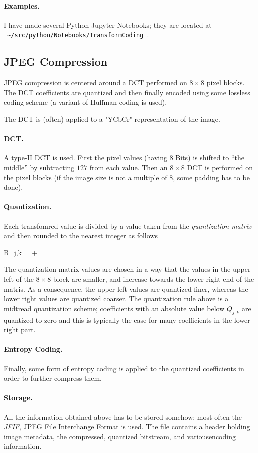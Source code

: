 \paragraph{Examples.} I have made several Python Jupyter Notebooks; they are located at \\ \verb+ ~/src/python/Notebooks/TransformCoding +. 

\subsection{JPEG Compression}

JPEG compression is centered around a DCT performed on $8 \times 8$ pixel blocks. The DCT coefficients are quantized and then finally encoded using some lossless coding scheme (a variant of Huffman coding is used). 

The DCT is (often) applied to a "YCbCr" representation of the image.

\paragraph{DCT.} A type-II DCT is used. First the pixel values (having $8$ Bits) is shifted to ``the middle'' by subtracting $127$ from each value. Then an $8 \times 8$ DCT is performed on the pixel blocks (if the image size is not a multiple of $8$, some padding has to be done).


\paragraph{Quantization.} Each transfomred value is divided by a value taken from the \emph{quantization matrix} and then rounded to the nearest integer as follows

\bee
B_{j,k} = \left\lfloor {} +  \right\rfloor
\eee

The quantization matrix values are chosen in a way that the values in the upper left of the $8 \times 8$ block are smaller, and increase towards the lower right end of the matris. As a consequence, the upper left values are quantized finer, whereas the lower right values are quantized coarser. The quantization rule above is a midtread quantization scheme; coefficients with an absolute value below $Q_{j,k}$ are quantized to zero and this is typically the case for many coefficients in the lower right part.


\paragraph{Entropy Coding.} Finally, some form of entropy coding is applied to the quantized coefficients in order to further compress them.


\paragraph{Storage.} All the information obtained above has to be stored somehow; most often the \emph{JFIF}, JPEG File Interchange Format is used. The file contains a header holding image metadata, the compressed, quantized bitstream, and variousencoding information.


